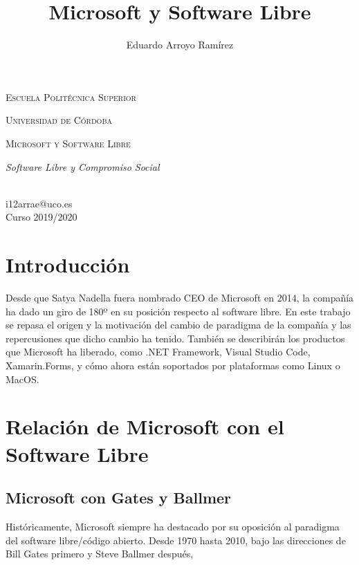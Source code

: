 \documentclass[10pt, titlepage]{article}
\title{Microsoft y Software Libre}
\author{Eduardo Arroyo Ramírez}
\begin{document}

\makeatletter
\begin{titlepage}
    \begin{center}
        {\scshape\Large Escuela Politécnica Superior \par}
        \vspace{0.5cm}
        {\scshape\large Universidad de Córdoba \par}
        \vspace{6cm}
        {\scshape\Huge Microsoft y Software Libre \par}
        \vspace{0.5cm}
        {\itshape\Large Software Libre y Compromiso Social \par}
    \end{center}
    \vspace{11cm}
    \begin{flushright}
        \@author\space \\
        i12arrae@uco.es \\
        Curso 2019/2020
    \end{flushright}
\end{titlepage}

\tableofcontents
\listoffigures
\listoftables
\clearpage

\justify
\section{Introducción}
Desde que Satya Nadella fuera nombrado CEO de Microsoft en 2014, la compañía ha dado un giro de 180º en su posición respecto al software libre. En este trabajo se repasa el origen y la motivación del cambio de paradigma de la compañía y las repercusiones que dicho cambio ha tenido. También se describirán los productos que Microsoft ha liberado, como .NET Framework, Visual Studio Code, Xamarin.Forms, y cómo ahora están soportados por plataformas como Linux o MacOS.

\section{Relación de Microsoft con el Software Libre}
\subsection{Microsoft con Gates y Ballmer}
Históricamente, Microsoft siempre ha destacado por su oposición al paradigma del software libre/código abierto. Desde 1970 hasta 2010, bajo las direcciones de Bill Gates primero y Steve Ballmer después, 
\end{document}
